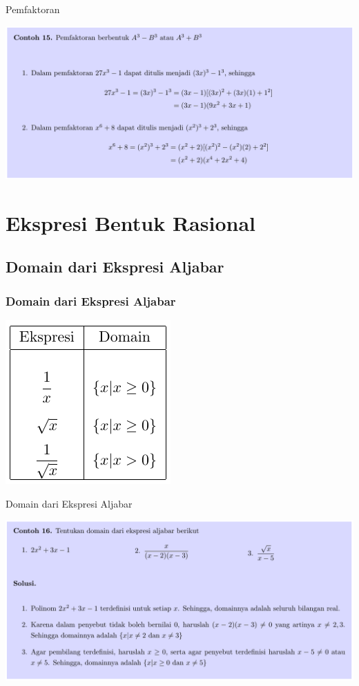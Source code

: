 \documentclass[pdflatex,compress,mathserif]{beamer}
\begin{document}
\begin{frame}{Pemfaktoran}
	\begin{center}
		\includegraphics[width=\linewidth]{img/img31}
	\end{center}
\end{frame}

\section{Ekspresi Bentuk Rasional}

\subsection{Domain dari Ekspresi Aljabar}

\begin{frame}
	\frametitle{Domain dari Ekspresi Aljabar}
	\begin{center}
		\includegraphics[width=0.5\linewidth]{img/img32}
	\end{center}
\end{frame}

\begin{frame}{Domain dari Ekspresi Aljabar}
	\begin{center}
		\includegraphics[width=\linewidth]{img/img33}
	\end{center}
\end{frame}
\end{document}
